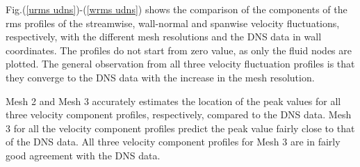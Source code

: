 Fig.(\ref{urms udns})-(\ref{wrms udns}) shows the comparison of the components of the rms profiles of the streamwise, wall-normal and spanwise velocity fluctuations, respectively, with the different mesh resolutions and the DNS data in wall coordinates. The profiles do not start from zero value, as only the fluid nodes are plotted. The general observation from all three velocity fluctuation profiles is that they converge to the DNS data with the increase in the mesh resolution. 

Mesh 2 and Mesh 3 accurately estimates the location of the peak values for all three velocity component profiles, respectively, compared to the DNS data. Mesh 3 for all the velocity component profiles predict the peak value fairly close to that of the DNS data. All three velocity component profiles for Mesh 3 are in fairly good agreement with the DNS data. 

